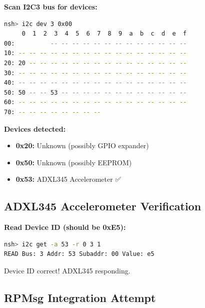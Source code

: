 \documentclass[12pt,a4paper]{report}
\begin{document}
\textbf{Scan I2C3 bus for devices:}

\begin{lstlisting}[language=bash]
nsh> i2c dev 3 0x00
     0  1  2  3  4  5  6  7  8  9  a  b  c  d  e  f
00:          -- -- -- -- -- -- -- -- -- -- -- -- -- 
10: -- -- -- -- -- -- -- -- -- -- -- -- -- -- -- -- 
20: 20 -- -- -- -- -- -- -- -- -- -- -- -- -- -- -- 
30: -- -- -- -- -- -- -- -- -- -- -- -- -- -- -- -- 
40: -- -- -- -- -- -- -- -- -- -- -- -- -- -- -- -- 
50: 50 -- -- 53 -- -- -- -- -- -- -- -- -- -- -- -- 
60: -- -- -- -- -- -- -- -- -- -- -- -- -- -- -- -- 
70: -- -- -- -- -- -- -- --
\end{lstlisting}

\textbf{Devices detected:}
\begin{itemize}
    \item \textbf{0x20:} Unknown (possibly GPIO expander)
    \item \textbf{0x50:} Unknown (possibly EEPROM)
    \item \textbf{0x53:} ADXL345 Accelerometer ✅
\end{itemize}


\subsection{ADXL345 Accelerometer Verification}

\textbf{Read Device ID (should be 0xE5):}

\begin{lstlisting}[language=bash]
nsh> i2c get -a 53 -r 0 3 1
READ Bus: 3 Addr: 53 Subaddr: 00 Value: e5
\end{lstlisting}

Device ID correct! ADXL345 responding.

\subsection{RPMsg Integration Attempt}
\end{document}
